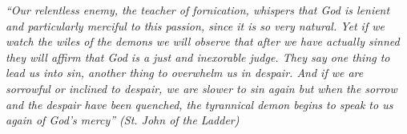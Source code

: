 \begin{center}
    \textit{``Our relentless enemy, the teacher of fornication, whispers that God is lenient and particularly merciful to this passion, since it is so very natural. Yet if we watch the wiles of the demons we will observe that after we have actually sinned they will affirm that God is a just and inexorable judge. They say one thing to lead us into sin, another thing to overwhelm us in despair. And if we are sorrowful or inclined to despair, we are slower to sin again but when the sorrow and the despair have been quenched, the tyrannical demon begins to speak to us again of God's mercy'' (St. John of the Ladder)}
\end{center}

